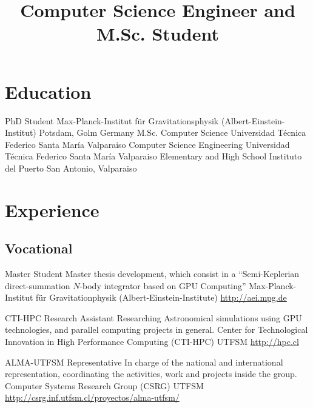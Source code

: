 \documentclass[11pt,a4paper]{moderncv}
\title{\large Computer Science Engineer and M.Sc. Student}
\begin{document}
\maketitle

\section{Education}

        {PhD Student}
        {Max-Planck-Institut für Gravitationsphysik}
        {(Albert-Einstein-Institut)}
        {Potsdam, Golm}
        {Germany}
        {M.Sc. Computer Science}
        {Universidad Técnica Federico Santa María}
        {Valparaiso}
        {}
        {}
        {Computer Science Engineering}
        {Universidad Técnica Federico Santa María}
        {Valparaiso}
        {}
        {}
        {Elementary and High School}
        {Instituto del Puerto}
        {San Antonio, Valparaiso}
        {}{}

\vspace{-0.5cm}

\section{Experience}
\subsection{Vocational}

        {Master Student}
        {Master thesis development, which consist in a %
        ``Semi-Keplerian direct-summation $N$-body integrator based on %
        GPU Computing'' }
        {Max-Planck-Institut für Gravitationphysik (Albert-Einstein-Institute)}
        {}
        {\url{http://aei.mpg.de}}

        {CTI-HPC Research Assistant}
        {Researching Astronomical simulations using GPU technologies, %
        and parallel computing projects in general.}
        {Center for Technological Innovation in High Performance Computing (CTI-HPC)}
        {UTFSM}
        {\url{http://hpc.cl}}

        {ALMA-UTFSM Representative}
        {In charge of the national and international representation, coordinating the activities, work and projects inside the group.}
        {Computer Systems Research Group (CSRG)}
        {UTFSM}
        {\url{http://csrg.inf.utfsm.cl/proyectos/alma-utfsm/}}
\end{document}
